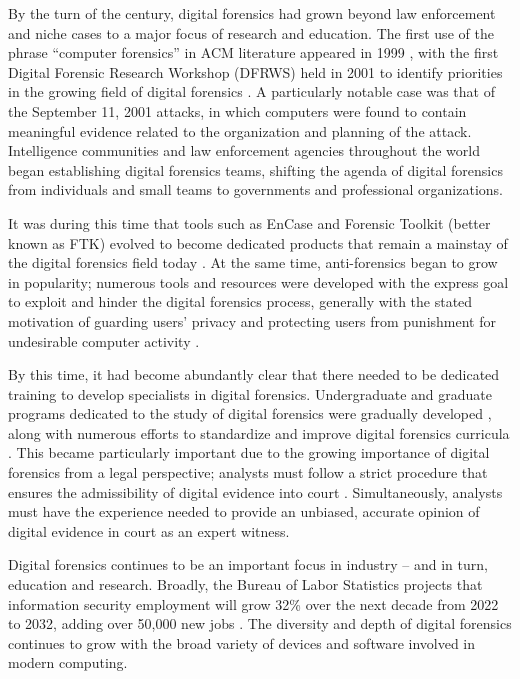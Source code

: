 \documentclass[letterpaper,12pt]{report}
\begin{document}
By the turn of the century, digital forensics had grown beyond law
enforcement and niche cases to a major focus of research and education.
The first use of the phrase ``computer forensics'' in ACM literature
appeared in 1999 \cite{cooperStandardsDigitalForensics2010}, with
the first Digital Forensic Research Workshop (DFRWS) held in 2001 to
identify priorities in the growing field of digital forensics
\cite{palmerRoadMapDigital2001}. A particularly notable case was
that of the September 11, 2001 attacks, in which computers were found to
contain meaningful evidence related to the organization and planning of
the attack. Intelligence communities and law enforcement agencies
throughout the world began establishing digital forensics teams,
shifting the agenda of digital forensics from individuals and small
teams to governments and professional organizations.

It was during this time that tools such as EnCase and Forensic Toolkit
(better known as FTK) evolved to become dedicated products that remain a
mainstay of the digital forensics field today
\cite{pollittHistoryDigitalForensics2010}. At the same time,
anti-forensics began to grow in popularity; numerous tools and resources
were developed with the express goal to exploit and hinder the digital
forensics process, generally with the stated motivation of guarding
users' privacy and protecting users from punishment for undesirable
computer activity
\cite{geigerEvaluatingCommercialCounterForensic2005,harrisArrivingAntiforensicsConsensus2006}.

By this time, it had become abundantly clear that there needed to be
dedicated training to develop specialists in digital forensics.
Undergraduate and graduate programs dedicated to the study of digital
forensics were gradually developed
\cite{andersonComparativeStudyTeaching2006}, along with numerous
efforts to standardize and improve digital forensics curricula
\cite{cooperStandardsDigitalForensics2010,nanceDigitalForensicsDefining2009,nanceDigitalForensicsDefining2010}.
This became particularly important due to the growing importance of
digital forensics from a legal perspective; analysts must follow a
strict procedure that ensures the admissibility of digital evidence into
court \cite{conklinComputerForensics2022}. Simultaneously, analysts
must have the experience needed to provide an unbiased, accurate opinion
of digital evidence in court as an expert witness.

Digital forensics continues to be an important focus in industry -- and
in turn, education and research. Broadly, the Bureau of Labor Statistics
projects that information security employment will grow 32\% over the
next decade from 2022 to 2032, adding over 50,000 new jobs
\cite{bureauoflaborstatisticsu.s.departmentoflaborInformationSecurityAnalysts2023}.
The diversity and depth of digital forensics continues to grow with the
broad variety of devices and software involved in modern computing.
\end{document}
